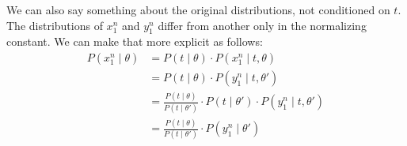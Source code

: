 \documentclass[a4paper,10pt,landscape,twocolumn]{scrartcl}
\begin{document}
	We can also say something about the original distributions, not conditioned on $t$. The distributions of $x_1^n$ and $y_1^n$ differ from another only in the normalizing constant. We can make that more explicit as follows:
	\begin{align}
	P(x_1^n \mid \theta) 
		&= P(t \mid \theta) \cdot P(x_1^n \mid t, \theta)\\
		&= P(t \mid \theta) \cdot P(y_1^n \mid t, \theta') \\
		&=\frac{P(t \mid \theta)}{P(t \mid \theta')} \cdot P(t \mid \theta') \cdot P(y_1^n \mid t, \theta')\\
		&= \frac{P(t \mid \theta)}{P(t \mid \theta')} \cdot  P(y_1^n \mid \theta')
	\end{align}
	
	
	
\end{document}
